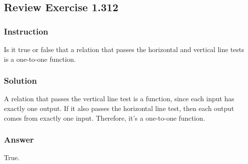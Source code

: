\subsection*{Review Exercise 1.312}

\subsubsection*{Instruction}

Is it true or false that a relation that passes the horizontal and vertical line tests is a one-to-one function.

\subsubsection*{Solution}

A relation that passes the vertical line test is a function, since each input has exactly one output. If it also passes the horizontal line test, then each output comes from exactly one input. Therefore, it's a one-to-one function.

\subsubsection*{Answer}

True.
